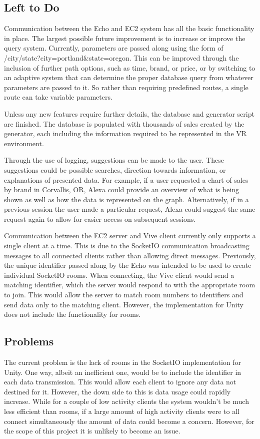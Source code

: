\documentclass[onecolumn, draftclsnofoot,10pt, compsoc]{IEEEtran}
\begin{document}
    \subsection{Left to Do}
    Communication between the Echo and EC2 system has all the basic functionality in place. The largest possible future improvement is to increase or improve the query system. Currently, parameters are passed along using the form of /city/state?city=portland\&state=oregon. This can be improved through the inclusion of further path options, such as time, brand, or price, or by switching to an adaptive system that can determine the proper database query from whatever parameters are passed to it. So rather than requiring predefined routes, a single route can take variable parameters.

    Unless any new features require further details, the database and generator script are finished. The database is populated with thousands of sales created by the generator, each including the information required to be represented in the VR environment.

    Through the use of logging, suggestions can be made to the user. These suggestions could be possible searches, direction towards information, or explanations of presented data. For example, if a user requested a chart of sales by brand in Corvallis, OR, Alexa could provide an overview of what is being shown as well as how the data is represented on the graph. Alternatively, if in a previous session the user made a particular request, Alexa could suggest the same request again to allow for easier access on subsequent sessions.

    Communication between the EC2 server and Vive client currently only supports a single client at a time. This is due to the SocketIO communication broadcasting messages to all connected clients rather than allowing direct messages. Previously, the unique identifier passed along by the Echo was intended to be used to create individual SocketIO rooms. When connecting, the Vive client would send a matching identifier, which the server would respond to with the appropriate room to join. This would allow the server to match room numbers to identifiers and send data only to the matching client. However, the implementation for Unity does not include the functionality for rooms.
    \subsection{Problems}
    The current problem is the lack of rooms in the SocketIO implementation for Unity. One way, albeit an inefficient one, would be to include the identifier in each data transmission. This would allow each client to ignore any data not destined for it. However, the down side to this is data usage could rapidly increase. While for a couple of low activity clients the system wouldn’t be much less efficient than rooms, if a large amount of high activity clients were to all connect simultaneously the amount of data could become a concern. However, for the scope of this project it is unlikely to become an issue.
\end{document}
